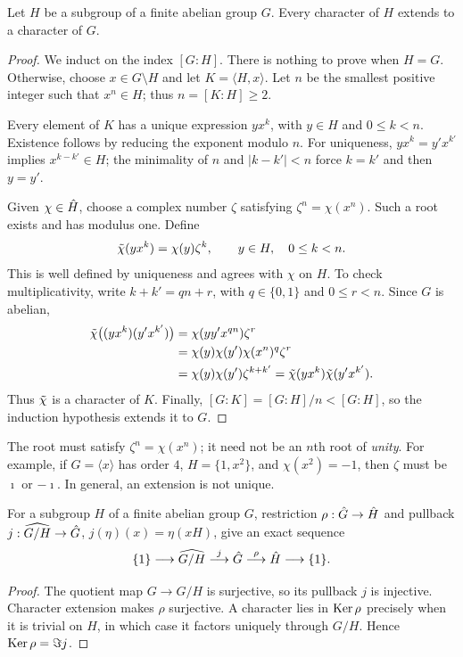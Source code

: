 \begin{lem}
\label{lem-prolongation-caractere}
Let $H$ be a subgroup of a finite abelian group $G$. Every character of $H$
extends to a character of $G$.
\end{lem}
\begin{proof}
\label{notation-15}
We induct on the index $[G:H]$. There is nothing to prove when $H=G$.
Otherwise, choose $x\in G\setminus H$ and let $K=\langle H,x\rangle$.
Let $n$ be the smallest positive integer such that $x^n\in H$; thus
$n=[K:H]\geq2$.

Every element of $K$ has a unique expression $yx^k$, with $y\in H$ and
$0\leq k<n$. Existence follows by reducing the exponent modulo $n$.
For uniqueness, $yx^k=y'x^{k'}$ implies $x^{k-k'}\in H$; the minimality
of $n$ and $|k-k'|<n$ force $k=k'$ and then $y=y'$.

Given $\chi\in\hat{H}$, choose a complex number $\zeta$ satisfying
$\zeta^n=\chi(x^n)$. Such a root exists and has modulus one. Define
\begin{equation}
\label{eq-formula-extension-character}
 \tilde{\chi}(yx^k)=\chi(y)\zeta^k,\qquad y\in H,\quad 0\leq k<n.
\end{equation}
This is well defined by uniqueness and agrees with $\chi$ on $H$.
To check multiplicativity, write $k+k'=qn+r$, with $q\in\{0,1\}$ and
$0\leq r<n$. Since $G$ is abelian,
\begin{align*}
 \tilde{\chi}\big((yx^k)(y'x^{k'})\big)
 &=\chi(yy'x^{qn})\zeta^r\\
 &=\chi(y)\chi(y')\chi(x^n)^q\zeta^r\\
 &=\chi(y)\chi(y')\zeta^{k+k'}
 =\tilde{\chi}(yx^k)\tilde{\chi}(y'x^{k'}).
\end{align*}
Thus $\tilde{\chi}$ is a character of $K$. Finally,
$[G:K]=[G:H]/n<[G:H]$, so the induction hypothesis extends it to $G$.
\end{proof}
The root must satisfy $\zeta^n=\chi(x^n)$; it need not be an $n$th root of
\emph{unity}. For example, if $G=\langle x\rangle$ has order $4$,
$H=\{1,x^2\}$, and $\chi(x^2)=-1$, then $\zeta$ must be $\imath$ or
$-\imath$. In general, an extension is not unique.


\begin{lem}
\label{lem-suite-exact}
For a subgroup $H$ of a finite abelian group $G$, restriction
$\rho:\hat{G}\to\hat{H}$ and pullback $j:\widehat{G/H}\to\hat{G}$,
$j(\eta)(x)=\eta(xH)$, give an exact sequence
\[
 \{1\}\longrightarrow\widehat{G/H}
 \overset{j}{\longrightarrow}\hat{G}
 \overset{\rho}{\longrightarrow}\hat{H}\longrightarrow\{1\}.
\]
\end{lem}
\begin{proof}
The quotient map $G\to G/H$ is surjective, so its pullback $j$ is injective.
Character extension makes $\rho$ surjective. A character lies in
$\operatorname{Ker}\rho$ precisely when it is trivial on $H$, in which case it factors
uniquely through $G/H$. Hence $\operatorname{Ker}\rho=\Im j$.
\end{proof}

